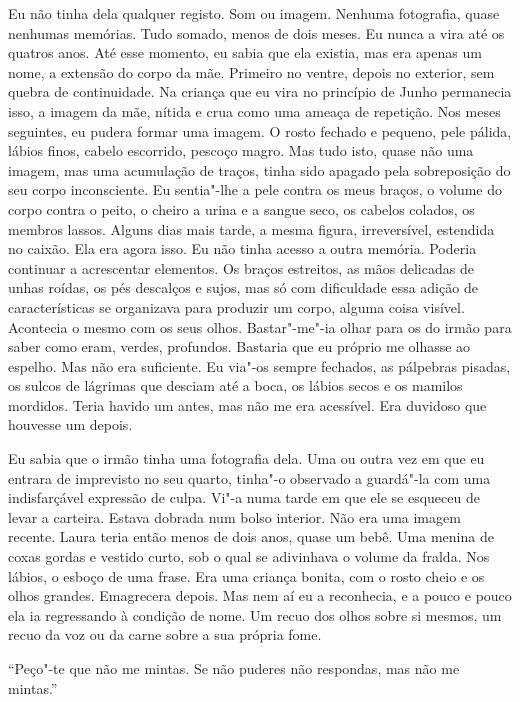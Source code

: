 Eu não tinha dela qualquer registo. Som ou imagem. Nenhuma fotografia,
quase nenhumas memórias. Tudo somado, menos de dois meses. Eu nunca a
vira até os quatros anos. Até esse momento, eu sabia que ela existia,
mas era apenas um nome, a extensão do corpo da mãe. Primeiro no ventre,
depois no exterior, sem quebra de continuidade. Na criança que eu vira
no princípio de Junho permanecia isso, a imagem da mãe, nítida e crua
como uma ameaça de repetição. Nos meses seguintes, eu pudera formar uma
imagem. O rosto fechado e pequeno, pele pálida, lábios finos, cabelo
escorrido, pescoço magro. Mas tudo isto, quase não uma imagem, mas uma
acumulação de traços, tinha sido apagado pela sobreposição do seu corpo
inconsciente. Eu sentia"-lhe a pele contra os meus braços, o volume do
corpo contra o peito, o cheiro a urina e a sangue seco, os cabelos
colados, os membros lassos. Alguns dias mais tarde, a mesma figura,
irreversível, estendida no caixão. Ela era agora isso. Eu não tinha
acesso a outra memória. Poderia continuar a acrescentar elementos. Os
braços estreitos, as mãos delicadas de unhas roídas, os pés descalços e
sujos, mas só com dificuldade essa adição de características se
organizava para produzir um corpo, alguma coisa visível. Acontecia o
mesmo com os seus olhos. Bastar"-me"-ia olhar para os do irmão para
saber como eram, verdes, profundos. Bastaria que eu próprio me olhasse
ao espelho. Mas não era suficiente. Eu via"-os sempre fechados, as
pálpebras pisadas, os sulcos de lágrimas que desciam até a boca, os
lábios secos e os mamilos mordidos. Teria havido um antes, mas não me
era acessível. Era duvidoso que houvesse um depois.

Eu sabia que o irmão tinha uma fotografia dela. Uma ou outra vez em que
eu entrara de imprevisto no seu quarto, tinha"-o observado a guardá"-la
com uma indisfarçável expressão de culpa. Vi"-a numa tarde em que ele se
esqueceu de levar a carteira. Estava dobrada num bolso interior. Não era
uma imagem recente. Laura teria então menos de dois anos, quase um bebê.
Uma menina de coxas gordas e vestido curto, sob o qual se adivinhava o
volume da fralda. Nos lábios, o esboço de uma frase. Era uma criança
bonita, com o rosto cheio e os olhos grandes. Emagrecera depois. Mas nem
aí eu a reconhecia, e a pouco e pouco ela ia regressando à condição de
nome. Um recuo dos olhos sobre si mesmos, um recuo da voz ou da carne
sobre a sua própria fome.

``Peço"-te que não me mintas. Se não puderes não respondas, mas não me
mintas.''

